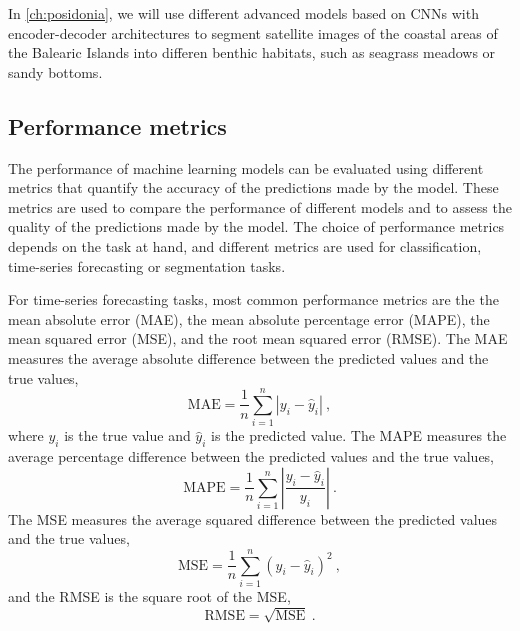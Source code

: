 In \cref{ch:posidonia}, we will use different advanced models based on CNNs
with encoder-decoder architectures to segment satellite images of the coastal
areas of the Balearic Islands into differen benthic habitats, such as seagrass
meadows or sandy bottoms.

\subsection{Performance metrics}

The performance of machine learning models can be evaluated using different
metrics that quantify the accuracy of the predictions made by the model. These
metrics are used to compare the performance of different models and to assess
the quality of the predictions made by the model. The choice of performance
metrics depends on the task at hand, and different metrics are used for
classification, time-series forecasting or segmentation tasks.

For time-series forecasting tasks, most common performance metrics are the
the mean absolute error (MAE), the mean absolute percentage error (MAPE), the
mean squared error (MSE), and the root mean squared error (RMSE). The MAE
measures the average absolute difference between the predicted values and the
true values,
\begin{equation}
  \text{MAE} = \frac{1}{n}\sum_{i=1}^{n}|y_i - \hat{y}_i| \ ,
\end{equation}
where $y_i$ is the true value and $\hat{y}_i$ is the predicted value. The MAPE
measures the average percentage difference between the predicted values and the
true values,
\begin{equation}
  \text{MAPE} = \frac{1}{n}\sum_{i=1}^{n}\left|\frac{y_i -
    \hat{y}_i}{y_i}\right| \ .
\end{equation}
The MSE measures the average squared difference between the predicted values
and the true values,
\begin{equation}
  \text{MSE} = \frac{1}{n}\sum_{i=1}^{n}(y_i - \hat{y}_i)^2 \ ,
\end{equation}
and the RMSE is the square root of the MSE,
\begin{equation}
  \text{RMSE} = \sqrt{\text{MSE}} \ .
\end{equation}

